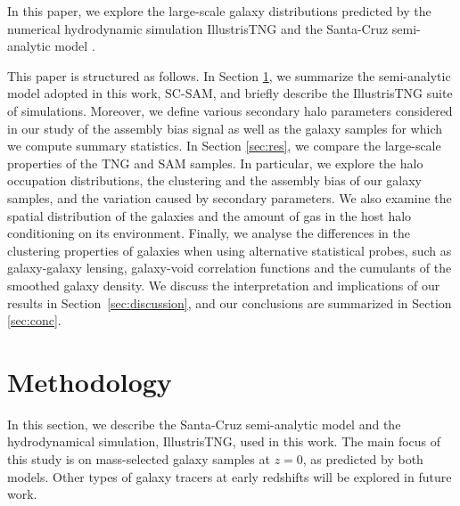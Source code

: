 \documentclass[fleqn,usenatbib]{mnras}
\begin{document}
In this paper, we explore the large-scale galaxy distributions predicted by the numerical hydrodynamic simulation IllustrisTNG \citep{2017MNRAS.465.3291W,2018MNRAS.473.4077P} and the Santa-Cruz semi-analytic model \citep{somerville:1999,2008MNRAS.391..481S,2015MNRAS.453.4337S,somerville:2021,Austen+2021}.

This paper is structured as follows. In Section \ref{sec:meth}, we summarize the semi-analytic model adopted in this work, SC-SAM, and briefly describe the IllustrisTNG suite of simulations. Moreover, we define various secondary halo parameters considered in our study of the assembly bias signal as well as the galaxy samples for which we compute summary statistics. In Section \ref{sec:res}, we compare the large-scale properties of the TNG and SAM samples. In particular, we explore the halo occupation distributions, the clustering and the assembly bias of our galaxy samples, and the variation caused by secondary parameters. We also examine the spatial distribution of the galaxies and the amount of gas in the host halo conditioning on its environment. Finally, we analyse the differences in the clustering properties of galaxies when using alternative statistical probes, such as galaxy-galaxy lensing, galaxy-void correlation functions and the cumulants of the smoothed galaxy density. We discuss the interpretation and implications of our results in Section~\ref{sec:discussion}, and our conclusions are summarized in Section \ref{sec:conc}.

\section{Methodology}
\label{sec:meth}
In this section, we describe the Santa-Cruz semi-analytic model and the hydrodynamical simulation, IllustrisTNG, used in this work. The main focus of this study is on mass-selected galaxy samples at $z = 0$, as predicted by both models. Other types of galaxy tracers at early redshifts will be explored in future work.
\end{document}
